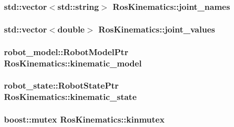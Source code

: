 \hypertarget{classRosKinematics_a0690908a8ee72e65685dc5b0a0da00df}{
\subsubsection[{joint\-\_\-names}]{\setlength{\rightskip}{0pt plus 5cm}std\-::vector$<$std\-::string$>$ Ros\-Kinematics\-::joint\-\_\-names}}\label{classRosKinematics_a0690908a8ee72e65685dc5b0a0da00df}
\hypertarget{classRosKinematics_af95c3ba0edaccafeb68022895b9824ac}{
\subsubsection[{joint\-\_\-values}]{\setlength{\rightskip}{0pt plus 5cm}std\-::vector$<$double$>$ Ros\-Kinematics\-::joint\-\_\-values}}\label{classRosKinematics_af95c3ba0edaccafeb68022895b9824ac}
\hypertarget{classRosKinematics_a0ab6cd969d40fa1e40707e8982f76f15}{
\subsubsection[{kinematic\-\_\-model}]{\setlength{\rightskip}{0pt plus 5cm}robot\-\_\-model\-::\-Robot\-Model\-Ptr Ros\-Kinematics\-::kinematic\-\_\-model}}\label{classRosKinematics_a0ab6cd969d40fa1e40707e8982f76f15}
\hypertarget{classRosKinematics_a2236796eba89e23f8b47b6fcd87a296d}{
\subsubsection[{kinematic\-\_\-state}]{\setlength{\rightskip}{0pt plus 5cm}robot\-\_\-state\-::\-Robot\-State\-Ptr Ros\-Kinematics\-::kinematic\-\_\-state}}\label{classRosKinematics_a2236796eba89e23f8b47b6fcd87a296d}
\hypertarget{classRosKinematics_a79f88926f9403d9b90cad26d0fa43193}{
\subsubsection[{kinmutex}]{\setlength{\rightskip}{0pt plus 5cm}boost\-::mutex Ros\-Kinematics\-::kinmutex}}\label{classRosKinematics_a79f88926f9403d9b90cad26d0fa43193}


